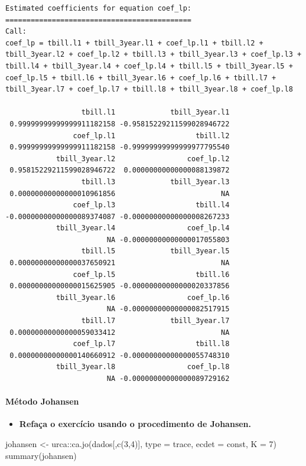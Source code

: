 \documentclass[
  letterpaper,
  DIV=11,
  numbers=noendperiod]{scrartcl}
\let\oldparagraph\paragraph
\renewcommand{\paragraph}[1]{\oldparagraph{#1}\mbox{}}
\newenvironment{Shaded}{\begin{snugshade}}{\end{snugshade}}
\newcommand{\AttributeTok}[1]{\textcolor[rgb]{0.40,0.45,0.13}{#1}}
\newcommand{\DecValTok}[1]{\textcolor[rgb]{0.68,0.00,0.00}{#1}}
\newcommand{\FunctionTok}[1]{\textcolor[rgb]{0.28,0.35,0.67}{#1}}
\newcommand{\NormalTok}[1]{\textcolor[rgb]{0.00,0.23,0.31}{#1}}
\newcommand{\OtherTok}[1]{\textcolor[rgb]{0.00,0.23,0.31}{#1}}
\newcommand{\SpecialCharTok}[1]{\textcolor[rgb]{0.37,0.37,0.37}{#1}}
\newcommand{\StringTok}[1]{\textcolor[rgb]{0.13,0.47,0.30}{#1}}
\providecommand{\tightlist}{%
  \setlength{\itemsep}{0pt}\setlength{\parskip}{0pt}}\usepackage{longtable,booktabs,array}
\begin{document}
\begin{verbatim}
Estimated coefficients for equation coef_lp: 
============================================ 
Call:
coef_lp = tbill.l1 + tbill_3year.l1 + coef_lp.l1 + tbill.l2 + tbill_3year.l2 + coef_lp.l2 + tbill.l3 + tbill_3year.l3 + coef_lp.l3 + tbill.l4 + tbill_3year.l4 + coef_lp.l4 + tbill.l5 + tbill_3year.l5 + coef_lp.l5 + tbill.l6 + tbill_3year.l6 + coef_lp.l6 + tbill.l7 + tbill_3year.l7 + coef_lp.l7 + tbill.l8 + tbill_3year.l8 + coef_lp.l8 

                  tbill.l1             tbill_3year.l1 
 0.99999999999999911182158 -0.95815229211599028946722 
                coef_lp.l1                   tbill.l2 
 0.99999999999999911182158 -0.99999999999999977795540 
            tbill_3year.l2                 coef_lp.l2 
 0.95815229211599028946722  0.00000000000000088139872 
                  tbill.l3             tbill_3year.l3 
 0.00000000000000010961856                         NA 
                coef_lp.l3                   tbill.l4 
-0.00000000000000089374087 -0.00000000000000008267233 
            tbill_3year.l4                 coef_lp.l4 
                        NA -0.00000000000000017055803 
                  tbill.l5             tbill_3year.l5 
 0.00000000000000037650921                         NA 
                coef_lp.l5                   tbill.l6 
 0.00000000000000015625905 -0.00000000000000020337856 
            tbill_3year.l6                 coef_lp.l6 
                        NA -0.00000000000000082517915 
                  tbill.l7             tbill_3year.l7 
 0.00000000000000059033412                         NA 
                coef_lp.l7                   tbill.l8 
 0.00000000000000140660912 -0.00000000000000055748310 
            tbill_3year.l8                 coef_lp.l8 
                        NA -0.00000000000000089729162 
\end{verbatim}

\newpage

\hypertarget{muxe9todo-johansen-1}{%
\paragraph{Método Johansen}\label{muxe9todo-johansen-1}}

\begin{itemize}
\tightlist
\item
  \textbf{Refaça o exercício usando o procedimento de Johansen.}
\end{itemize}

\begin{Shaded}
\begin{Highlighting}[]
\NormalTok{johansen }\OtherTok{\textless{}{-}}\NormalTok{ urca}\SpecialCharTok{::}\FunctionTok{ca.jo}\NormalTok{(dados[,}\FunctionTok{c}\NormalTok{(}\DecValTok{3}\NormalTok{,}\DecValTok{4}\NormalTok{)], }\AttributeTok{type =} \StringTok{\textquotesingle{}trace\textquotesingle{}}\NormalTok{, }\AttributeTok{ecdet =} \StringTok{\textquotesingle{}const\textquotesingle{}}\NormalTok{, }\AttributeTok{K =} \DecValTok{7}\NormalTok{)}
\FunctionTok{summary}\NormalTok{(johansen)}
\end{Highlighting}
\end{Shaded}
\end{document}
